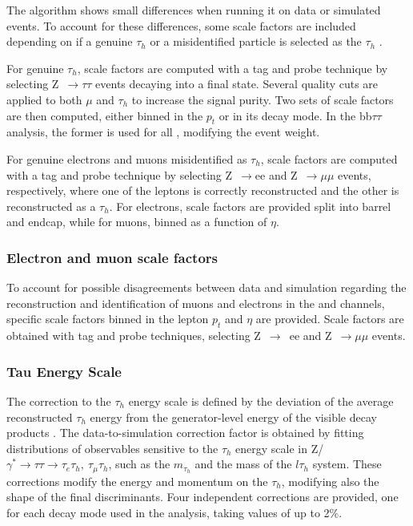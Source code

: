 \documentclass[../main.tex]{subfiles}
\begin{document}
The \deeptau{} algorithm shows small differences when running it on data or simulated events. To account for these differences, some scale factors are included depending on if a genuine $\tau_h$ or a misidentified particle is selected as the $\tau_h$ \cite{tau_performance_2022}. 

For genuine $\tau_h$, scale factors are computed with a tag and probe technique by selecting Z~$\to\tau\tau$ events decaying into a \taumu\tauh{} final state. Several quality cuts are applied to both $\mu$ and $\tau_h$ to increase the signal purity. Two sets of scale factors are then computed, either binned in the \tauh{} $p_t$ or in its decay mode. In the bb$\tau\tau$ analysis, the former is used for all \tauh{}, modifying the event weight.

For genuine electrons and muons misidentified as $\tau_h$, scale factors are computed with a tag and probe technique by selecting Z~$\to$ee and Z~$\to\mu\mu$ events, respectively, where one of the leptons is correctly reconstructed and the other is reconstructed as a $\tau_h$. For electrons, scale factors are provided split into barrel and endcap, while for muons, binned as a function of $\eta$.

\subsubsection*{Electron and muon scale factors}

To account for possible disagreements between data and simulation regarding the reconstruction and identification of muons and electrons in the \taumu\tauh{} and \taue\tauh{} channels, specific scale factors binned in the lepton $p_t$ and $\eta$ are provided. Scale factors are obtained with tag and probe techniques, selecting Z~$\to$~ee and Z~$\to\mu\mu$ events.

\subsubsection*{Tau Energy Scale}

The correction to the $\tau_h$ energy scale is defined by the deviation of the average reconstructed $\tau_h$ energy from the generator-level energy of the visible \tauh{} decay products \cite{tau_performance_2018, tau_performance_2022}. The data-to-simulation correction factor is obtained by fitting distributions of observables sensitive to the $\tau_h$ energy scale in Z/$\gamma^*\to\tau\tau\to\tau_e\tau_h,~\tau_\mu\tau_h$, such as the $m_{\tau_h}$ and the mass of the $l\tau_h$ system. These corrections modify the energy and momentum on the $\tau_h$, modifying also the shape of the final discriminants. Four independent corrections are provided, one for each decay mode used in the analysis, taking values of up to 2\%. 
\end{document}
